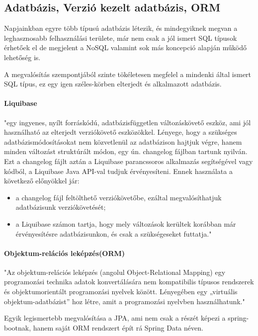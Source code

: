 \subsection{Adatbázis, Verzió kezelt adatbázis, ORM}

Napjainkban egyre több típusú adatbázis létezik, és mindegyiknek megvan a leghasznosabb felhasználási területe, már nem csak a jól ismert SQL típusok érhetőek el de megjelent a NoSQL valamint sok más koncepció alapján működő lehetőség is.

A megvalósítás szempontjából szinte tökéletesen megfelel a mindenki által ismert SQL típus, ez egy igen széles-körben elterjedt és alkalmazott adatbázis.

\paragraph{Liquibase} "egy ingyenes, nyílt forráskódú, adatbázisfüggetlen változáskövető eszköz, ami jól használható az elterjedt verziókövető eszközökkel. Lényege, hogy a szükséges adatbázismódosításokat nem közvetlenül az adatbázison hajtjuk végre, hanem minden változást struktúrált módon, egy ún. changelog fájlban tartunk nyilván. Ezt a changelog fájlt aztán a Liquibase parancssoros alkalmazás segítségével vagy kódból, a Liquibase Java API-val tudjuk érvényesíteni. Ennek használata a következő előnyökkel jár:

\begin{itemize}
	\item a changelog fájl feltölthető verziókövetőbe, ezáltal megvalósíthatjuk adatbázisunk verziókövetését;
	\item a Liquibase számon tartja, hogy mely változások kerültek korábban már érvényesítésre adatbázisunkon, és csak a szükségeseket futtatja." \cite{liquibase}
\end{itemize}

\paragraph{Objektum-relációs leképzés(ORM)}
"Az objektum-relációs leképzés (angolul \newline Object-Relational Mapping) egy programozási technika adatok konvertálására nem kompatibilis típusos rendszerek és objektumorientált programozási nyelvek között. Lényegében egy „virtuális objektum-adatbázist” hoz létre, amit a programozási nyelvben használhatunk."\cite{orm}

Egyik legismertebb megvalósítása a JPA, ami nem csak a részét képezi a spring-bootnak, hanem saját ORM rendszert épít rá Spring Data néven.

